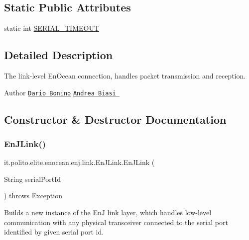 \subsection*{Static Public Attributes}
\begin{DoxyCompactItemize}
\item 
static int \hyperlink{classit_1_1polito_1_1elite_1_1enocean_1_1enj_1_1link_1_1_en_j_link_a6376bb54751bb2739c160ab28a5bdd27}{S\+E\+R\+I\+A\+L\+\_\+\+T\+I\+M\+E\+O\+UT}
\end{DoxyCompactItemize}


\subsection{Detailed Description}
The link-\/level En\+Ocean connection, handles packet transmission and reception.

\begin{DoxyAuthor}{Author}
\href{mailto:dario.bonino@gmail.com}{\tt Dario Bonino}  \href{mailto:biasiandrea04@gmail.com}{\tt Andrea Biasi } 
\end{DoxyAuthor}


\subsection{Constructor \& Destructor Documentation}
\hypertarget{classit_1_1polito_1_1elite_1_1enocean_1_1enj_1_1link_1_1_en_j_link_a226e37d4d44df6ac0916d314f9953bdd}{}\label{classit_1_1polito_1_1elite_1_1enocean_1_1enj_1_1link_1_1_en_j_link_a226e37d4d44df6ac0916d314f9953bdd} 
\subsubsection{\texorpdfstring{En\+J\+Link()}{EnJLink()}}
{\footnotesize\ttfamily it.\+polito.\+elite.\+enocean.\+enj.\+link.\+En\+J\+Link.\+En\+J\+Link (\begin{DoxyParamCaption}\item[{String}]{serial\+Port\+Id }\end{DoxyParamCaption}) throws Exception}

Builds a new instance of the EnJ link layer, which handles low-\/level communication with any physical transceiver connected to the serial port identified by given serial port id. 

